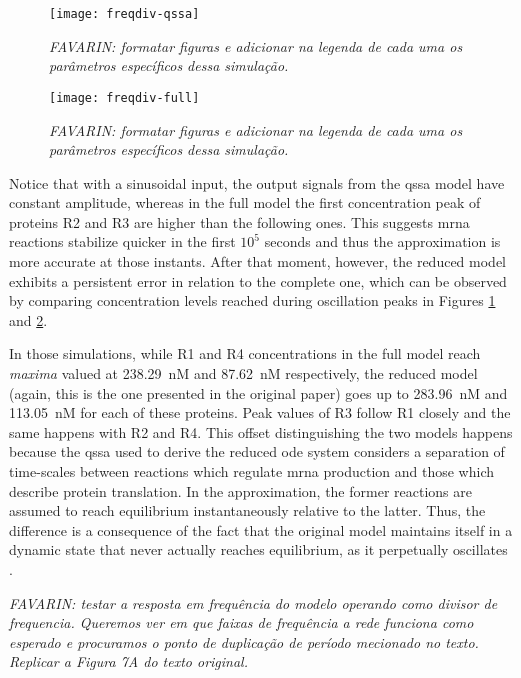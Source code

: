     \begin{figure}[!htbp]
      \centering
      \texttt{[image: freqdiv-qssa]}
      \caption{\textit{FAVARIN: formatar figuras e adicionar na legenda de cada uma os parâmetros específicos dessa simulação.}}
      \label{fig.freqdiv-qssa}
    \end{figure}

    \begin{figure}[!htbp]
      \centering
      \texttt{[image: freqdiv-full]}
      \caption{\textit{FAVARIN: formatar figuras e adicionar na legenda de cada uma os parâmetros específicos dessa simulação.}}
      \label{fig.freqdiv-full}
    \end{figure}

    Notice that with a sinusoidal input, the output signals from the \ac{qssa} model have constant amplitude, whereas in the full model the first concentration peak of proteins R2 and R3 are higher than the following ones.
    This suggests \acs{mrna} reactions stabilize quicker in the first $10^5$ seconds and thus the approximation is more accurate at those instants.
    After that moment, however, the reduced model exhibits a persistent error in relation to the complete one, which can be observed by comparing concentration levels reached during oscillation peaks in Figures \ref{fig.freqdiv-qssa} and \ref{fig.freqdiv-full}.

    In those simulations, while R1 and R4 concentrations in the full model reach \textit{maxima} valued at \SI{238.29}{\nano M} and \SI{87.62}{\nano M} respectively, the reduced model (again, this is the one presented in the original paper) goes up to \SI{283.96}{\nano M} and \SI{113.05}{\nano M} for each of these proteins.
    Peak values of R3 follow R1 closely and the same happens with R2 and R4.
    This offset distinguishing the two models happens because the \ac{qssa} used to derive the reduced \ac{ode} system considers a separation of time-scales between reactions which regulate \acs{mrna} production and those which describe protein translation.
    In the approximation, the former reactions are assumed to reach equilibrium instantaneously relative to the latter.
    Thus, the difference is a consequence of the fact that the original model maintains itself in a dynamic state that never actually reaches equilibrium, as it perpetually oscillates \cite{ingalls}.

    \textit{FAVARIN: testar a resposta em frequência do modelo operando como divisor de frequencia.
    Queremos ver em que faixas de frequência a rede funciona como esperado e procuramos o ponto de duplicação de período mecionado no texto.
    Replicar a Figura 7A do texto original.}


